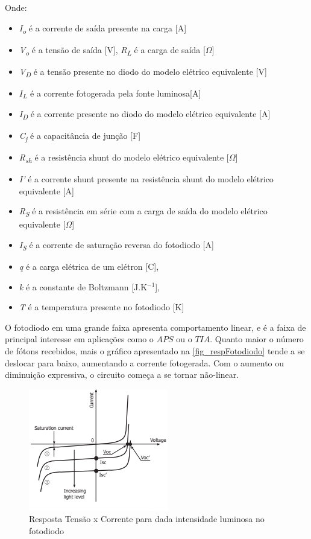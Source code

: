 Onde:
\begin{itemize}
    \item \emph{I\textsubscript{o}} \'e a corrente de saída presente na carga [A]
    \item \emph{V\textsubscript{o}} \'e a tensão de saída [V], \emph{R\textsubscript{L}} \'e a carga de saída [$\Omega$]
    \item \emph{V\textsubscript{D}} \'e a tens\~ao presente no diodo do modelo el\'etrico equivalente [V]
    \item $I_L$ \'e a corrente fotogerada pela fonte luminosa[A]
    \item  \emph{I\textsubscript{D}} \'e a corrente presente no diodo do modelo el\'etrico equivalente [A]
    \item \emph{C\textsubscript{j}} \'e a capacit\^ancia de junç\~ao [F]
    \item \emph{R\textsubscript{sh}} \'e a resist\^encia shunt do modelo el\'etrico equivalente [$\Omega$]
    \item \emph{I\rq} \'e a corrente shunt presente na resistência shunt do modelo el\'etrico equivalente [A]
    \item \emph{R\textsubscript{S}} \'e a resistência em s\'erie com a carga de saída do modelo el\'etrico equivalente [$\Omega$]
    \item \emph{I\textsubscript{S}} \'e a corrente de saturação reversa do fotodiodo [A]
    \item \emph{q} \'e a carga el\'etrica de um el\'etron [C], \item \emph{k} \'e a constante de Boltzmann [J.K$^{-1}$],
    \item \emph{T} \'e a temperatura presente no fotodiodo [K]
\end{itemize}

O fotodiodo em uma grande faixa apresenta comportamento linear, e \'e a faixa de principal interesse em aplica{\c c}\~oes como o $APS$ ou o $TIA$. Quanto maior o n\'umero de f\'otons recebidos, mais o gr\'afico apresentado na \autoref{fig_respFotodiodo} tende a se deslocar para baixo, aumentando a corrente fotogerada. Com o aumento ou diminui{\c c}\~ao expressiva, o circuito come{\c c}a a se tornar n\~ao-linear.

\begin{figure}[htb]
	\caption{\label{fig_respFotodiodo}Resposta Tens\~ao x Corrente para dada intensidade luminosa no fotodiodo}
	\begin{center}
	    \includegraphics[scale=1]{Imagens/graficoRespostaFotodiodo.png}
	\end{center}
\end{figure}

